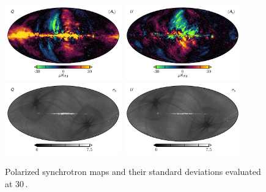 \documentclass[twocolumn]{../../common/aa}
\begin{document}
\begin{figure}
	\centering
	\includegraphics[width=0.45\textwidth]{figures/synch_Q.pdf}
	\includegraphics[width=0.45\textwidth]{figures/synch_U.pdf}\\
	\includegraphics[width=0.45\textwidth]{figures/synch_Q_std.pdf}
	\includegraphics[width=0.45\textwidth]{figures/synch_U_std.pdf}\\
	\caption{Polarized synchrotron maps and their standard deviations evaluated at 30\,\GHz.}\label{fig:polarized_foregrounds}
\end{figure}
\end{document}

